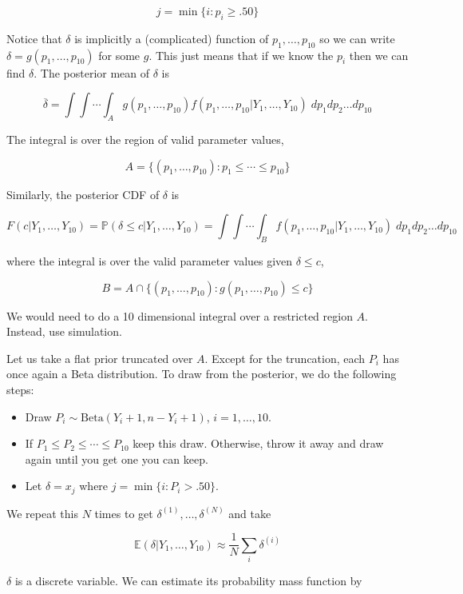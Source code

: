 \[ j = \min \{ i: p_{i} \geq .50 \} \]

Notice that \(\delta\) is implicitly a (complicated) function of
\(p_{1}, \dots, p_{10}\) so we can write
\(\delta = g(p_{1}, \dots, p_{10})\) for some \(g\). This just means that
if we know the \(p_{i}\) then we can find \(\delta\). The posterior mean
of \(\delta\) is

\[ \overline{\delta} = \int \int \cdots \int_A g(p_{1}, \dots, p_{10}) f(p_{1}, \dots, p_{10} | Y_{1}, \dots, Y_{10} ) \; dp_{1} dp_{2} \dots dp_{10} \]

The integral is over the region of valid parameter values,

\[ A = \{ (p_{1}, \dots, p_{10}) : p_{1} \leq \cdots \leq p_{10} \} \]

Similarly, the posterior CDF of \(\delta\) is

\[
F(c | Y_{1}, \dots, Y_{10}) = \mathbb{P}(\delta \leq c | Y_{1}, \dots, Y_{10}) = \int \int \cdots \int_B f(p_{1}, \dots, p_{10} | Y_{1}, \dots, Y_{10} ) \; dp_{1} dp_{2} \dots dp_{10}
\]

where the integral is over the valid parameter values given $
\delta \leq c$,

\[ B = A \cap \{ (p_{1}, \dots, p_{10}) : g(p_{1}, \dots, p_{10}) \leq c \} \]

We would need to do a 10 dimensional integral over a restricted region
\(A\). Instead,  use simulation.

Let us take a flat prior truncated over \(A\). Except for the
truncation, each \(P_{i}\) has once again a Beta distribution. To draw
from the posterior, we do the following steps:

\begin{itemize}[tightlist]
\item
  Draw \(P_{i} \sim \text{Beta}(Y_{i} + 1, n - Y_{i} + 1)\),
  \(i = 1, \dots, 10\).
\item
  If \(P_{1} \leq P_{2} \leq \cdots \leq P_{10}\) keep this draw. Otherwise,
  throw it away and draw again until you get one you can keep.
\item
  Let \(\delta = x_{j}\) where \(j = \min \{ i : P_{i} > .50 \}\).
\end{itemize}

We repeat this \(N\) times to get \(\delta^{(1)}, \dots, \delta^{(N)}\)
and take

\[ \mathbb{E}(\delta | Y_{1}, \dots, Y_{10}) \approx \frac{1}{N} \sum_{i} \delta^{(i)} \]

\(\delta\) is a discrete variable. We can estimate its probability mass
function by

